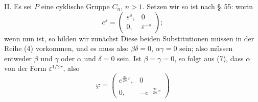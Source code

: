II. Es sei $P$ eine cyklische Gruppe $C_n$, $n > 1$.
Setzen wir
so ist nach \S.\,55:
worin
\[
c^s = \begin{pmatrix} \varepsilon^s, & 0 \\ 0, & \varepsilon^{-s} \end{pmatrix};
\]
wenn nun
ist, so bilden wir zun\"achst
Diese beiden Substitutionen m\"ussen in der Reihe (4) vorkommen, und es muss also $\beta\delta = 0$, $\alpha\gamma = 0$ sein; also m\"ussen entweder $\beta$ und $\gamma$ oder $\alpha$ und $\delta = 0$ sein. Ist $\beta = \gamma = 0$, so folgt aus (7), dass $\alpha$ von der Form $\varepsilon^{1/2\,r}$, also
\[
\varphi = \begin{pmatrix} e^{\frac{\pi i}{2n}\,r}, & 0 \\ 0, & -e^{-\frac{\pi i}{2n}\,r} \end{pmatrix}
\]
